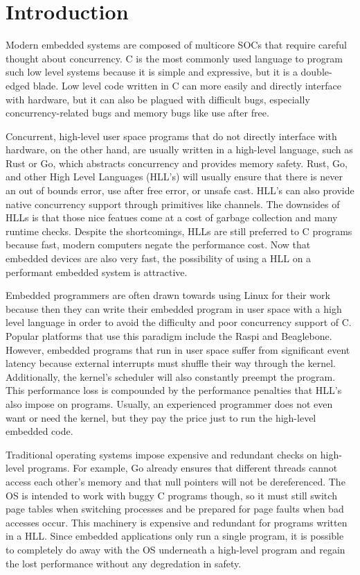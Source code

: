 
\chapter{Introduction}

Modern embedded systems are composed of multicore SOCs that require
careful thought about concurrency. C is the
most commonly used language to program such low level systems because
it is simple and expressive, but it is
a double-edged blade. Low level code written in C can more easily and
directly interface with hardware, but it can also be plagued with
difficult bugs, especially concurrency-related bugs and memory bugs like
use after free.

Concurrent, high-level user space programs that do not directly interface with
hardware, on the other hand, are usually written in a
high-level language, such as Rust or Go, which abstracts concurrency
and provides memory safety. Rust, Go, and other High Level Languages (HLL's)
will usually ensure that there is never an out of bounds error, use
after free error, or unsafe cast. HLL's can also provide native concurrency
support through primitives like channels. The downsides of HLLs is that those
nice featues come at a cost of garbage collection and many runtime checks.
Despite the shortcomings, HLLs are still preferred to C programs because fast,
modern computers negate the performance cost. Now that embedded devices are also very fast,
the possibility of using a HLL on a performant embedded system is attractive.

Embedded programmers are often drawn towards using Linux for their work
because then they can write their embedded program in user space with a
high level language in order to avoid the difficulty and poor concurrency
support of C. Popular platforms that use this paradigm include
the Raspi and Beaglebone. However, embedded programs that run in user space suffer
from significant event latency because external interrupts
must shuffle their way through the kernel. Additionally, the kernel's scheduler
will also constantly preempt the program. This performance loss is compounded by the
performance penalties that HLL's also impose on programs.
Usually, an experienced programmer does not even want or need the
kernel, but they pay the price just to run the high-level embedded code.

Traditional operating systems impose expensive and redundant checks on
high-level programs. For example,
Go already ensures that different threads cannot access each other's memory and that null pointers
will not be dereferenced. The OS is intended to work with buggy C programs though, so it must still switch
page tables when switching processes and be prepared for page faults when bad accesses occur. This machinery
is expensive and redundant for programs written in a HLL. Since embedded applications only run a single
program, it is possible to completely do away with the OS underneath a high-level program and regain the
lost performance without any degredation in safety.

